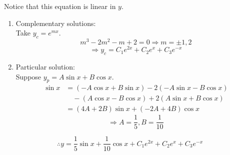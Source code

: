 \item

Notice that this equation is linear in $y$.
\begin{enumerate}[wide, labelindent = 0pt, label = (\roman*)]
	\item Complementary solutions:\\
	      Take $y_c = e^{mx}$.
	      \[
		      m^3 - 2m^2 - m + 2 = 0
		      \Rightarrow m = \pm 1, 2
	      \]
	      \[
		      \Rightarrow y_c = C_1 e^{2x} + C_2 e^x + C_3 e^{-x}
	      \]

	\item Particular solution:\\
	      Suppose $y_p = A\sin x + B\cos x$.
	      \begin{align*}
		      \sin x
		       &= (-A\cos x + B\sin x) - 2(-A\sin x - B\cos x)         \\
		       &\quad - (A\cos x - B\cos x) + 2(A\sin x + B\cos x) \\
		       &= (4A + 2B)\sin x + (-2A + 4B)\cos x
	      \end{align*}
	      \[
		      \Rightarrow A = \frac{1}{5}, B = \frac{1}{10}
	      \]
\end{enumerate}
\[
	\therefore y = \frac{1}{5}\sin x + \frac{1}{10}\cos x + C_1 e^{2x} + C_2 e^x + C_3 e^{-x}
\]